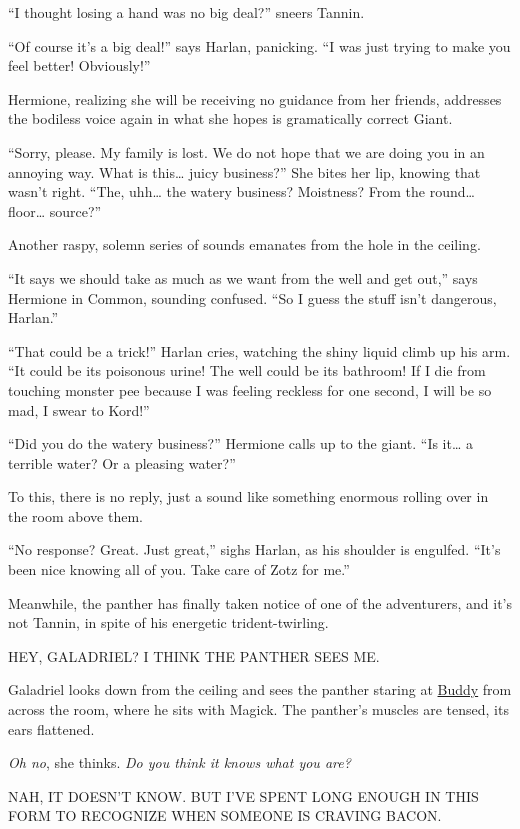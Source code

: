 \documentclass[smalldemyvopaper,11pt,twoside,onecolumn,openright,extrafontsizes]{memoir}
\begin{document}
``I thought losing a hand was no big deal?'' sneers Tannin.

``Of course it's a big deal!'' says Harlan, panicking. ``I was just
trying to make you feel better! Obviously!''

Hermione, realizing she will be receiving no guidance from her friends,
addresses the bodiless voice again in what she hopes is gramatically
correct Giant.

``Sorry, please. My family is lost. We do not hope that we are doing you
in an annoying way. What is this\ldots{} juicy business?'' She bites her
lip, knowing that wasn't right. ``The, uhh\ldots{} the watery business?
Moistness? From the round\ldots{} floor\ldots{} source?''

Another raspy, solemn series of sounds emanates from the hole in the
ceiling.

``It says we should take as much as we want from the well and get out,''
says Hermione in Common, sounding confused. ``So I guess the stuff isn't
dangerous, Harlan.''

``That could be a trick!'' Harlan cries, watching the shiny liquid climb
up his arm. ``It could be its poisonous urine! The well could be its
bathroom! If I die from touching monster pee because I was feeling
reckless for one second, I will be so mad, I swear to Kord!''

``Did you do the watery business?'' Hermione calls up to the giant. ``Is
it\ldots{} a terrible water? Or a pleasing water?''

To this, there is no reply, just a sound like something enormous rolling
over in the room above them.

``No response? Great. Just great,'' sighs Harlan, as his shoulder is
engulfed. ``It's been nice knowing all of you. Take care of Zotz for
me.''

Meanwhile, the panther has finally taken notice of one of the
adventurers, and it's not Tannin, in spite of his energetic
trident-twirling.

HEY, GALADRIEL? I THINK THE PANTHER SEES ME.

Galadriel looks down from the ceiling and sees the panther staring at
\href{/characters/buddy/}{Buddy} from across the room, where he sits
with Magick. The panther's muscles are tensed, its ears flattened.

\emph{Oh no}, she thinks. \emph{Do you think it knows what you are?}

NAH, IT DOESN'T KNOW. BUT I'VE SPENT LONG ENOUGH IN THIS FORM TO
RECOGNIZE WHEN SOMEONE IS CRAVING BACON.
\end{document}
